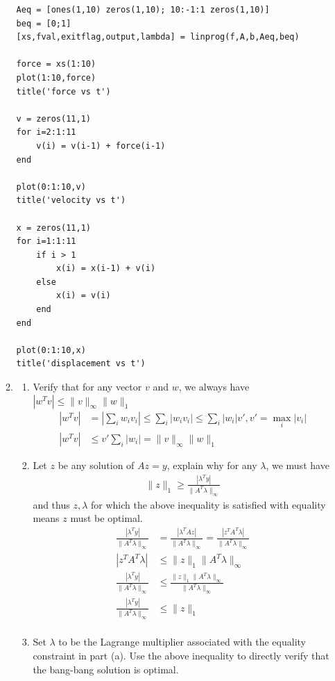 \documentclass[12pt,letter]{article}
\newcommand{\norm}[1]{\|#1\|}
\begin{document}
\begin{enumerate}
\begin{enumerate}
\begin{verbatim}
Aeq = [ones(1,10) zeros(1,10); 10:-1:1 zeros(1,10)]
beq = [0;1]
[xs,fval,exitflag,output,lambda] = linprog(f,A,b,Aeq,beq)

force = xs(1:10)
plot(1:10,force)
title('force vs t')

v = zeros(11,1)
for i=2:1:11
    v(i) = v(i-1) + force(i-1)
end

plot(0:1:10,v)
title('velocity vs t')

x = zeros(11,1)
for i=1:1:11
    if i > 1
        x(i) = x(i-1) + v(i)
    else
        x(i) = v(i)
    end
end

plot(0:1:10,x)
title('displacement vs t')
\end{verbatim}
    \pagebreak
  \item
    \begin{enumerate}
    \item Verify that for any vector $v$ and $w$, we always have $|w^Tv| \leq \norm{v}_{\infty} \norm{w}_1$
      \begin{align*}
        |w^Tv| &= |\sum_i w_i v_i| \leq \sum_i |w_i v_i| \leq  \sum_i |w_i|v', v' = \max_i |v_i|\\
        |w^Tv| &\leq v' \sum_i |w_i| = \norm{v}_{\infty} \norm{w}_1
      \end{align*}
    \item Let $z$ be any solution of $Az=y$, explain why for any $\lambda$, we must have
      \begin{align*}
        \norm{z}_1 \geq \frac{|\lambda^Ty|}{\norm{A^T\lambda}_{\infty}}
      \end{align*}
      and thus $z,\lambda$ for which the above inequality is satisfied with equality means $z$ must be optimal.
      \begin{align*}
        \frac{|\lambda^Ty|}{\norm{A^T\lambda}_{\infty}} &= \frac{|\lambda^TAz|}{\norm{A^T\lambda}_{\infty}}=\frac{|z^TA^T\lambda|}{\norm{A^T\lambda}_{\infty}}\\
        |z^TA^T\lambda| &\leq \norm{z}_1 \norm{A^T\lambda}_{\infty}\\
        \frac{|\lambda^Ty|}{\norm{A^T\lambda}_{\infty}} &\leq \frac{\norm{z}_1 \norm{A^T\lambda}_{\infty}}{\norm{A^T\lambda}_{\infty}}\\
        \frac{|\lambda^Ty|}{\norm{A^T\lambda}_{\infty}} &\leq \norm{z}_1\\
      \end{align*}
    \item Set $\lambda$ to be the Lagrange multiplier associated with the equality constraint in part (a). Use the above inequality to directly verify that the bang-bang solution is optimal.

\end{enumerate}
\end{enumerate}
\end{enumerate}
\end{document}
